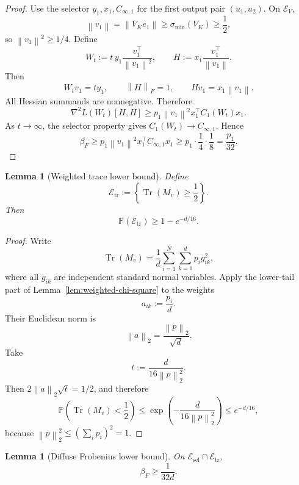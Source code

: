 \documentclass[11pt]{article}
\newtheorem{lemma}[theorem]{Lemma}
\newcommand{\Pp}{\mathbb{P}}
\newcommand{\1}{\mathbf{1}}
\newcommand{\Tr}{\operatorname{Tr}}
\newcommand{\norm}[1]{\left\|#1\right\|}
\begin{document}
\begin{proof}
Use the selector \(y_1,x_1,C_{\infty,1}\) for the first output pair
\((u_1,u_2)\).  On \(\mathcal E_V\),
\[
 \norm{v_1}=\norm{V_Ke_1}\ge\sigma_{\min}(V_K)\ge\frac12,
\]
so \(\norm{v_1}^2\ge1/4\).  Define
\[
 W_t:=t\,y_1\frac{v_1^\top}{\norm{v_1}^2},
 \qquad
 H:=x_1\frac{v_1^\top}{\norm{v_1}}.
\]
Then
\[
 W_tv_1=ty_1,
 \qquad
 \norm{H}_F=1,
 \qquad
 Hv_1=x_1\norm{v_1}.
\]
All Hessian summands are nonnegative.  Therefore
\[
 \nabla^2L(W_t)[H,H]
 \ge
 p_1\norm{v_1}^2x_1^\top C_1(W_t)x_1.
\]
As \(t\to\infty\), the selector property gives
\(C_1(W_t)\to C_{\infty,1}\).  Hence
\[
 \beta_F
 \ge
 p_1\norm{v_1}^2x_1^\top C_{\infty,1}x_1
 \ge
 p_1\cdot\frac14\cdot\frac18
 =\frac{p_1}{32}.
\]
\end{proof}

\begin{lemma}[Weighted trace lower bound]
\label{lem:trace-lower}
Define
\[
 \mathcal E_{\mathrm{tr}}
 :=
 \left\{\Tr(M_v)\ge\frac12\right\}.
\]
Then
\[
 \Pp(\mathcal E_{\mathrm{tr}})\ge1-e^{-d/16}.
\]
\end{lemma}

\begin{proof}
Write
\[
 \Tr(M_v)
 =
 \frac1d\sum_{i=1}^N\sum_{k=1}^d p_i g_{ik}^2,
\]
where all \(g_{ik}\) are independent standard normal variables.  Apply the
lower-tail part of Lemma~\ref{lem:weighted-chi-square} to the weights
\[
 a_{ik}:=\frac{p_i}{d}.
\]
Their Euclidean norm is
\[
 \norm{a}_2
 =
 \frac{\norm{p}_2}{\sqrt d}.
\]
Take
\[
 t:=\frac{d}{16\norm{p}_2^2}.
\]
Then \(2\norm{a}_2\sqrt t=1/2\), and therefore
\[
 \Pp\left(\Tr(M_v)<\frac12\right)
 \le
 \exp\left(-\frac{d}{16\norm{p}_2^2}\right)
 \le e^{-d/16},
\]
because \(\norm{p}_2^2\le(\sum_i p_i)^2=1\).
\end{proof}

\begin{lemma}[Diffuse Frobenius lower bound]
\label{lem:diffuse-lower}
On \(\mathcal E_{\mathrm{sel}}\cap\mathcal E_{\mathrm{tr}}\),
\[
 \beta_F\ge\frac1{32d}.
\]
\end{lemma}
\end{document}
